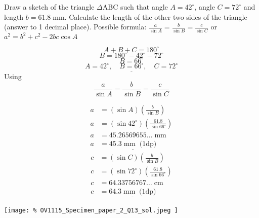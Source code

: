 \question  Draw a sketch of the triangle $\Delta \text{ABC}$ such that 
angle $A=42^{\circ}$, 
angle $C=72^{\circ}$
and 
length $b = 61.8 \; \text{mm}$. 
Calculate the length of the other two sides of the triangle 
(answer to 1 decimal place).
\newline
Possible formula: 
\( 
	\frac{a}{\sin{A}} = \frac{b}{\sin{B}} = \frac{c}{\sin{C}} 
\)
 or 
\(
	a^{2} = b^{2} + c^{2} - 2bc \cos{A}
\)
\begin{solution}
	\[
		A + B + C = 180^{\circ}
	\]
	\[
		B = 180^{\circ} - 42^{\circ} - 72^{\circ}
	\]
	\[
		B = 66^{\circ}
	\]
	\[
		\underline{
			A = 42^{\circ}, 
			\quad 
			B = 66^{\circ}, 
			\quad 
			C = 72^{\circ}
		}
	\]
	Using
	\[
		\frac{a}{\sin{A}} = \frac{b}{\sin{B}} = \frac{c}{\sin{C}}
	\]
	\begin{multicols}{2}
		\noindent
		\begin{align*}
			a 
				&= (\sin{A}) \left( \frac{b}{\sin{B}} \right)
				\\
			a 
				&= 
				(\sin{42^{\circ}}) \left( \frac{61.8}{\sin{66^{\circ}}} \right)
				\\
			a 
				&= 45.26569655\ldots \; \text{mm}
				\\
			a 
				&= \underline{
					45.3 
					\; \text{mm} \;\; \text{(1dp)}
				}
		\end{align*}
		\begin{align*}
			c 
				&= (\sin{C}) \left( \frac{b}{\sin{B}} \right)
				\\
			c 
				&= 
				(\sin{72^{\circ}}) \left( \frac{61.8}{\sin{66^{\circ}}} \right)
				\\
			c 
				&= 64.33756767\ldots \; \text{cm}
				\\
			c 
				&= \underline{
					64.3
					\; \text{mm} \;\; \text{(1dp)}
				}
		\end{align*}
	\end{multicols}
	\begin{center}
		\texttt{[image: \%
		OV1115\_Specimen\_paper\_2\_Q13\_sol.jpeg
		]}
	\end{center}
\end{solution}

